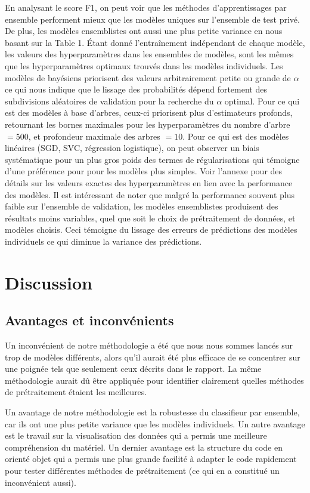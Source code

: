 \documentclass{article}
\begin{document}
En analysant le score F1, on peut voir que les méthodes d'apprentissages par ensemble performent mieux que les modèles uniques sur l'ensemble de test privé. De plus, les modèles ensemblistes ont aussi une plus petite variance en nous basant sur la Table 1. Étant donné l'entraînement indépendant de chaque modèle, les valeurs des hyperparamètres dans les ensembles de modèles, sont les mêmes que les hyperparamètres optimaux trouvés dans les modèles individuels. Les modèles de bayésiens priorisent des valeurs arbitrairement petite ou grande de $\alpha$ ce qui nous indique que le lissage des probabilités dépend fortement des subdivisions aléatoires de validation pour la recherche du $\alpha$ optimal. Pour ce qui est des modèles à base d'arbres, ceux-ci priorisent plus d'estimateurs profonds, retournant les bornes maximales pour les hyperparamètres du nombre d'arbre $=500$, et profondeur maximale des arbres $=10$. Pour ce qui est des modèles linéaires (SGD, SVC, régression logistique), on peut observer un biais systématique pour un plus gros poids des termes de régularisations qui témoigne d'une préférence pour pour les modèles plus simples. Voir l'annexe pour des détails sur les valeurs exactes des hyperparamètres en lien avec la performance des modèles. Il est intéressant de noter que malgré la performance souvent plus faible sur l'ensemble de validation, les modèles ensemblistes produisent des résultats moins variables, quel que soit le choix de prétraitement de données, et modèles choisis. Ceci témoigne du lissage des erreurs de prédictions des modèles individuels ce qui diminue la variance des prédictions.
\section{Discussion}
\subsection{Avantages et inconvénients}
Un inconvénient de notre méthodologie a été que nous nous sommes lancés sur trop de modèles différents, alors qu'il aurait été plus efficace de se concentrer sur une poignée tels que seulement ceux décrits dans le rapport. La même méthodologie aurait dû être appliquée pour identifier clairement quelles méthodes de prétraitement étaient les meilleures.

Un avantage de notre méthodologie est la robustesse du classifieur par ensemble, car ils ont une plus petite variance que les modèles individuels. Un autre avantage est le travail sur la visualisation des données qui a permis une meilleure compréhension du matériel. Un dernier avantage est la structure du code en orienté objet qui a permis une plus grande facilité à adapter le code rapidement pour tester différentes méthodes de prétraitement (ce qui en a constitué un inconvénient aussi).
\end{document}
